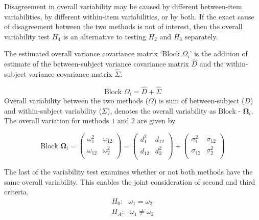 \documentclass[12pt, a4paper]{report}
\theoremstyle{plain}
\theoremstyle{definition}
\theoremstyle{remark}
\begin{document}
			
			
			
			Disagreement in overall variability may be caused by different between-item variabilities, by different within-item variabilities, or by both.  If the exact cause of disagreement between the two methods is not of interest, then the overall variability test $H_4$ is an alternative to testing $H_2$ and $H_3$ separately.
			
			The estimated overall variance covariance matrix `Block
			$\Omega_{i}$' is the addition of estimate of the between-subject variance covariance matrix $\hat{D}$ and the within-subject variance covariance matrix $\hat{\Sigma}$.
			
			\begin{equation}
			\mbox{Block  }\Omega_{i} = \hat{D} + \hat{\Sigma}
			\end{equation}
			Overall variability between the two methods ($\Omega$) is sum of between-subject ($D$) and within-subject variability ($\Sigma$),
			\citet{ARoy2009} denotes the overall variability	as ${\mbox{Block - }\boldsymbol \Omega_{i}}$. The overall variation for methods $1$ and $2$ are given by
			
			\begin{center}
				\[\mbox{Block } \boldsymbol{\Omega}_i = \left(\begin{array}{cc}
				\omega^2_1  & \omega_{12} \\
				\omega_{12} & \omega^2_2 \\
				\end{array}  \right)
				=  \left(
				\begin{array}{cc}
				d^2_1  & d_{12} \\
				d_{12} & d^2_2 \\
				\end{array} \right)+
				\left(
				\begin{array}{cc}
				\sigma^2_1  & \sigma_{12} \\
				\sigma_{12} & \sigma^2_2 \\
				\end{array}\right)
				\]
			\end{center}
			
			The last of the variability test examines whether or not both methods have the same overall variability. This enables the joint consideration of second and third criteria.
			\begin{eqnarray*}
				H_{0}: \mbox{ }\omega_{1}  = \omega_{2} \\
				H_{A}: \mbox{ }\omega_{1}  \neq \omega_{2}
			\end{eqnarray*}
			
\end{document}
